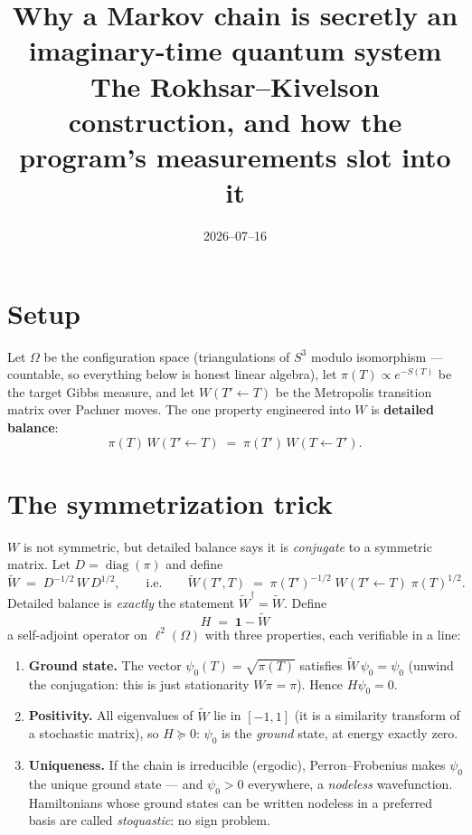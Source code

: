 \documentclass[11pt]{article}
\title{Why a Markov chain is secretly an imaginary-time quantum system\\
\large The Rokhsar--Kivelson construction, and how the program's measurements slot into it}
\author{}
\date{2026--07--16}
\newcommand{\Wt}{\widetilde W}
\begin{document}
\maketitle

\section{Setup}

Let $\Omega$ be the configuration space (triangulations of $S^3$ modulo isomorphism ---
countable, so everything below is honest linear algebra), let
$\pi(T) \propto e^{-S(T)}$ be the target Gibbs measure, and let
$W(T' \!\leftarrow\! T)$ be the Metropolis transition matrix over Pachner moves. The one
property engineered into $W$ is \textbf{detailed balance}:
\[
\pi(T)\, W(T'\!\leftarrow\!T) \;=\; \pi(T')\, W(T\!\leftarrow\!T') .
\]

\section{The symmetrization trick}

$W$ is not symmetric, but detailed balance says it is \emph{conjugate} to a symmetric
matrix. Let $D = \operatorname{diag}(\pi)$ and define
\[
\Wt \;=\; D^{-1/2}\, W\, D^{1/2},
\qquad\text{i.e.}\qquad
\Wt(T',T) \;=\; \pi(T')^{-1/2}\; W(T'\!\leftarrow\!T)\; \pi(T)^{1/2} .
\]
Detailed balance is \emph{exactly} the statement $\Wt^{\dagger} = \Wt$. Define
\[
\boxed{\;H \;=\; \mathbf{1} - \Wt\;}
\]
a self-adjoint operator on $\ell^2(\Omega)$ with three properties, each verifiable in a
line:
\begin{enumerate}
\item \textbf{Ground state.} The vector $\psi_0(T) = \sqrt{\pi(T)}$ satisfies
$\Wt\,\psi_0 = \psi_0$ (unwind the conjugation: this is just stationarity
$W\pi = \pi$). Hence $H\psi_0 = 0$.
\item \textbf{Positivity.} All eigenvalues of $\Wt$ lie in $[-1,1]$ (it is a
similarity transform of a stochastic matrix), so $H \succeq 0$: $\psi_0$ is the
\emph{ground} state, at energy exactly zero.
\item \textbf{Uniqueness.} If the chain is irreducible (ergodic), Perron--Frobenius
makes $\psi_0$ the unique ground state --- and $\psi_0 > 0$ everywhere, a
\emph{nodeless} wavefunction. Hamiltonians whose ground states can be written nodeless
in a preferred basis are called \emph{stoquastic}: no sign problem.
\end{enumerate}
\end{document}
